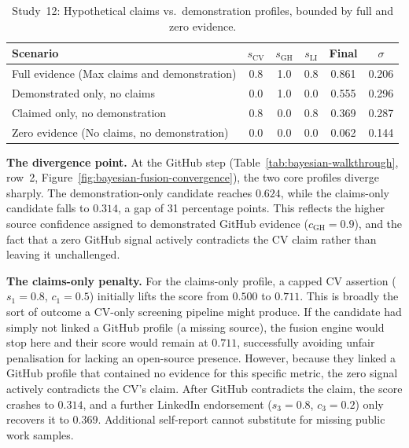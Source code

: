 \begin{table}[htbp]
    \centering
    \caption[Study~12: Claims vs.\ demonstration]{Study~12: Hypothetical claims vs.\ demonstration profiles, bounded by full and zero evidence.}
    \label{tab:bayesian-scenario-comparison}
    \small
    \setlength{\tabcolsep}{4pt}
    \begin{tabular}{l c c c c c}
        \toprule
        \textbf{Scenario} & $s_{\mathrm{CV}}$ & $s_{\mathrm{GH}}$ & $s_{\mathrm{LI}}$ &
        \textbf{Final} & $\sigma$ \\ \midrule
        Full evidence (Max claims and demonstration) & 0.8 & 1.0 & 0.8 & 0.861 & 0.206 \\
        Demonstrated only, no claims   & 0.0 & 1.0 & 0.0 & 0.555 & 0.296 \\
        Claimed only, no demonstration & 0.8 & 0.0 & 0.8 & 0.369 & 0.287 \\
        Zero evidence (No claims, no demonstration) & 0.0 & 0.0 & 0.0 & 0.062 & 0.144 \\ \bottomrule
    \end{tabular}
\end{table}

\textbf{The divergence point.} At the GitHub step (Table~\ref{tab:bayesian-walkthrough}, row~2, 
Figure~\ref{fig:bayesian-fusion-convergence}), the two core profiles diverge sharply. The 
demonstration-only candidate reaches $0.624$, while the claims-only candidate falls to $0.314$, a gap of 31 percentage points. This 
reflects the higher source confidence assigned to demonstrated GitHub evidence ($c_{\mathrm{GH}} = 0.9$), and the fact that a zero 
GitHub signal actively contradicts the CV claim rather than leaving it unchallenged.

\textbf{The claims-only penalty.} For the claims-only profile, a capped CV assertion ($s_1 = 0.8$, $c_1 = 0.5$) initially lifts the score from $0.500$ to $0.711$. This is
broadly the sort of outcome a CV-only screening pipeline might produce. If the candidate had simply not linked a GitHub profile (a missing source), 
the fusion engine would stop here and their score would remain at $0.711$, successfully avoiding unfair penalisation for lacking an open-source presence. 
However, because they linked a GitHub profile that contained no evidence for this specific metric, the zero signal actively contradicts the CV's claim. After GitHub contradicts the claim, the score crashes to $0.314$, and a
further LinkedIn endorsement ($s_3 = 0.8$, $c_3 = 0.2$) only recovers it to $0.369$. Additional self-report cannot substitute for missing
public work samples.


